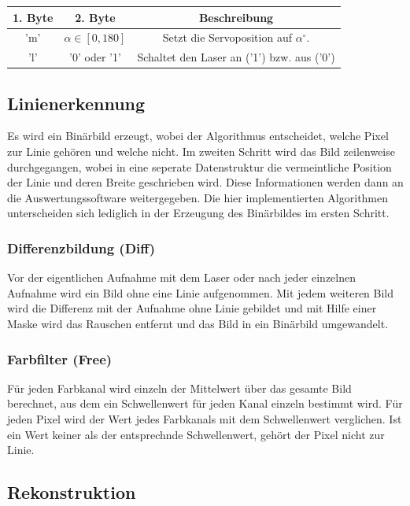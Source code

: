 \documentclass[ngerman,a4paper,parskip=half]{scrartcl}
\begin{document}
\begin{tabular}{|c|c|c|}
\hline
1. Byte & 2. Byte & Beschreibung \\
\hline
'm'\footnotemark & $\alpha \in [0,180]$ & Setzt die Servoposition auf $\alpha ^\circ$.\\
\hline
'l' & '0' oder '1' & Schaltet den Laser an ('1') bzw. aus ('0')\\
\hline
\end{tabular}



\subsection{Linienerkennung}

Es wird ein Binärbild erzeugt, wobei der Algorithmus entscheidet, welche Pixel zur Linie gehören und welche nicht. Im zweiten Schritt wird das Bild zeilenweise durchgegangen, wobei in eine seperate Datenstruktur die vermeintliche Position der Linie und deren Breite geschrieben wird. Diese Informationen werden dann an die Auswertungssoftware weitergegeben. Die hier implementierten Algorithmen unterscheiden sich lediglich in der Erzeugung des Binärbildes im ersten Schritt.

\subsubsection{Differenzbildung (Diff)}

Vor der eigentlichen Aufnahme mit dem Laser oder nach jeder einzelnen Aufnahme wird ein Bild ohne eine Linie aufgenommen. Mit jedem weiteren Bild wird die Differenz mit der Aufnahme ohne Linie gebildet und mit Hilfe einer Maske wird das Rauschen entfernt und das Bild in ein Binärbild umgewandelt.

\subsubsection{Farbfilter (Free)}

Für jeden Farbkanal wird einzeln der Mittelwert über das gesamte Bild berechnet, aus dem ein Schwellenwert für jeden Kanal einzeln bestimmt wird. Für jeden Pixel wird der Wert jedes Farbkanals mit dem Schwellenwert verglichen. Ist ein Wert keiner als der entsprechnde Schwellenwert, gehört der Pixel nicht zur Linie.

\subsection{Rekonstruktion}
\end{document}

